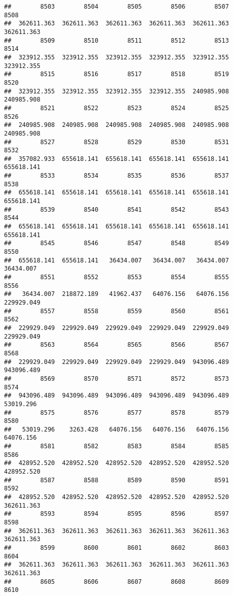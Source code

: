 \documentclass[
]{book}
\begin{document}
\begin{verbatim}
##        8503        8504        8505        8506        8507        8508 
##  362611.363  362611.363  362611.363  362611.363  362611.363  362611.363 
##        8509        8510        8511        8512        8513        8514 
##  323912.355  323912.355  323912.355  323912.355  323912.355  323912.355 
##        8515        8516        8517        8518        8519        8520 
##  323912.355  323912.355  323912.355  323912.355  240985.908  240985.908 
##        8521        8522        8523        8524        8525        8526 
##  240985.908  240985.908  240985.908  240985.908  240985.908  240985.908 
##        8527        8528        8529        8530        8531        8532 
##  357082.933  655618.141  655618.141  655618.141  655618.141  655618.141 
##        8533        8534        8535        8536        8537        8538 
##  655618.141  655618.141  655618.141  655618.141  655618.141  655618.141 
##        8539        8540        8541        8542        8543        8544 
##  655618.141  655618.141  655618.141  655618.141  655618.141  655618.141 
##        8545        8546        8547        8548        8549        8550 
##  655618.141  655618.141   36434.007   36434.007   36434.007   36434.007 
##        8551        8552        8553        8554        8555        8556 
##   36434.007  218872.189   41962.437   64076.156   64076.156  229929.049 
##        8557        8558        8559        8560        8561        8562 
##  229929.049  229929.049  229929.049  229929.049  229929.049  229929.049 
##        8563        8564        8565        8566        8567        8568 
##  229929.049  229929.049  229929.049  229929.049  943096.489  943096.489 
##        8569        8570        8571        8572        8573        8574 
##  943096.489  943096.489  943096.489  943096.489  943096.489   53019.296 
##        8575        8576        8577        8578        8579        8580 
##   53019.296    3263.428   64076.156   64076.156   64076.156   64076.156 
##        8581        8582        8583        8584        8585        8586 
##  428952.520  428952.520  428952.520  428952.520  428952.520  428952.520 
##        8587        8588        8589        8590        8591        8592 
##  428952.520  428952.520  428952.520  428952.520  428952.520  362611.363 
##        8593        8594        8595        8596        8597        8598 
##  362611.363  362611.363  362611.363  362611.363  362611.363  362611.363 
##        8599        8600        8601        8602        8603        8604 
##  362611.363  362611.363  362611.363  362611.363  362611.363  362611.363 
##        8605        8606        8607        8608        8609        8610 

\end{verbatim}
\end{document}

